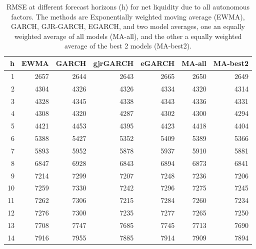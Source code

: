 \documentclass{article}
\begin{document}
\begin{table}[ht]
\centering
\begin{tabular}{rrrrrrr}
  \hline
h & EWMA & GARCH & gjrGARCH & eGARCH & MA-all & MA-best2 \\ 
  \hline
1 & 2657 & 2644 & 2643 & 2665 & 2650 & 2649 \\ 
  2 & 4304 & 4326 & 4326 & 4334 & 4320 & 4314 \\ 
  3 & 4328 & 4345 & 4338 & 4343 & 4336 & 4331 \\ 
  4 & 4308 & 4320 & 4287 & 4302 & 4300 & 4294 \\ 
  5 & 4421 & 4453 & 4395 & 4423 & 4418 & 4404 \\ 
  6 & 5388 & 5427 & 5352 & 5409 & 5389 & 5366 \\ 
  7 & 5893 & 5952 & 5878 & 5937 & 5910 & 5881 \\ 
  8 & 6847 & 6928 & 6843 & 6894 & 6873 & 6841 \\ 
  9 & 7214 & 7299 & 7207 & 7248 & 7236 & 7206 \\ 
  10 & 7259 & 7330 & 7242 & 7296 & 7275 & 7245 \\ 
  11 & 7262 & 7306 & 7215 & 7284 & 7260 & 7234 \\ 
  12 & 7276 & 7300 & 7235 & 7277 & 7265 & 7250 \\ 
  13 & 7708 & 7747 & 7685 & 7745 & 7713 & 7690 \\ 
  14 & 7916 & 7955 & 7885 & 7914 & 7909 & 7894 \\ 
   \hline
\end{tabular}
\caption{RMSE at different forecast horizons (h) for net liquidity due to all autonomous factors. The methods are Exponentially weighted moving average (EWMA), GARCH, GJR-GARCH, EGARCH, and two model averages, one an equally weighted average of all models (MA-all), and the other a equally weighted average of the best 2 models (MA-best2).} 
\label{tab:rmseagg}
\end{table}
\end{document}
